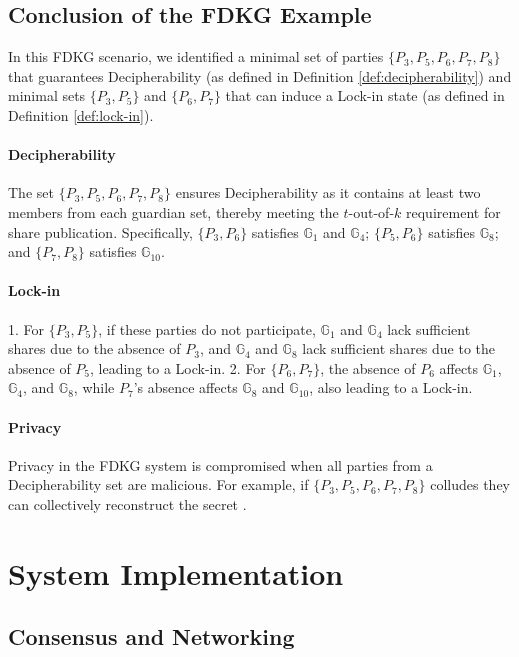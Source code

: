 \documentclass{article}
\begin{document}
\subsection*{Conclusion of the FDKG Example}

In this FDKG scenario, we identified a minimal set of parties \(\{P_3, P_5, P_6, P_7, P_8\}\) that guarantees Decipherability (as defined in Definition \ref{def:decipherability}) and minimal sets \(\{P_3, P_5\}\) and \(\{P_6, P_7\}\) that can induce a Lock-in state (as defined in Definition \ref{def:lock-in}).

\paragraph{Decipherability}
The set \(\{P_3, P_5, P_6, P_7, P_8\}\) ensures Decipherability as it contains at least two members from each guardian set, thereby meeting the \(t\)-out-of-\(k\) requirement for share publication. Specifically, \(\{P_3, P_6\}\) satisfies \(\mathbb{G}_1\) and \(\mathbb{G}_4\); \(\{P_5, P_6\}\) satisfies \(\mathbb{G}_8\); and \(\{P_7, P_8\}\) satisfies \(\mathbb{G}_{10}\).

\paragraph{Lock-in}
1. For \(\{P_3, P_5\}\), if these parties do not participate, \(\mathbb{G}_1\) and \(\mathbb{G}_4\) lack sufficient shares due to the absence of \(P_3\), and \(\mathbb{G}_4\) and \(\mathbb{G}_8\) lack sufficient shares due to the absence of \(P_5\), leading to a Lock-in.
2. For \(\{P_6, P_7\}\), the absence of \(P_6\) affects \(\mathbb{G}_1\), \(\mathbb{G}_4\), and \(\mathbb{G}_8\), while \(P_7\)'s absence affects \(\mathbb{G}_8\) and \(\mathbb{G}_{10}\), also leading to a Lock-in.

\paragraph{Privacy}
Privacy in the FDKG system is compromised when all parties from a Decipherability set are malicious. For example, if \(\{P_3, P_5, P_6, P_7, P_8\}\) colludes they can collectively reconstruct the secret \DecryptionKey.

\section{System Implementation}

\subsection{Consensus and Networking}
\end{document}
